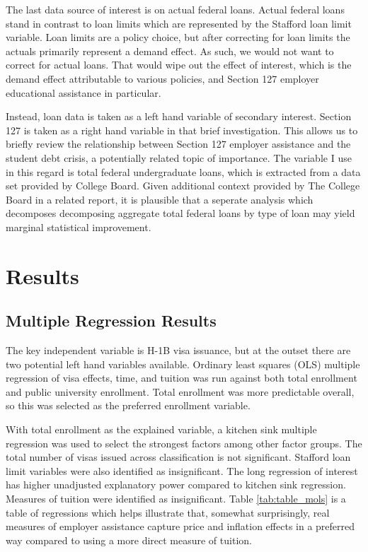\documentclass[review]{elsarticle}
\begin{document}
    The last data source of interest is on actual federal loans.
    Actual federal loans stand in contrast to loan limits which are represented by the Stafford loan limit variable.
    Loan limits are a policy choice, but after correcting for loan limits the actuals primarily represent a demand effect.
    As such, we would not want to correct for actual loans.
    That would wipe out the effect of interest,
    which is the demand effect attributable to various policies,
    and Section 127 employer educational assistance in particular.

    Instead, loan data is taken as a left hand variable of secondary interest.
    Section 127 is taken as a right hand variable in that brief investigation.
    This allows us to briefly review the relationship between Section 127 employer assistance
    and the student debt crisis, a potentially related topic of importance.
    The variable I use in this regard is total federal undergraduate loans,
    which is extracted from a data set provided by College Board\cite{cb_excel_2019}.
    Given additional context provided by The College Board in a related report\cite{cb_trends_2019},
    it is plausible that a seperate analysis which decomposes decomposing aggregate total federal loans by type of loan may yield marginal statistical improvement.

    \section{Results}

    \subsection{Multiple Regression Results}
    The key independent variable is H-1B visa issuance, but at the outset there are two potential left hand variables available.
    Ordinary least squares (OLS) multiple regression of visa effects, time, and tuition was run against both total enrollment and public university enrollment.
    Total enrollment was more predictable overall, so this was selected as the preferred enrollment variable.

    With total enrollment as the explained variable,
    a kitchen sink multiple regression was used to select the strongest factors among other factor groups.
    The total number of visas issued across classification is not significant.
    Stafford loan limit variables were also identified as insignificant.
    The long regression of interest has higher unadjusted explanatory power compared to kitchen sink regression.
    Measures of tuition were identified as insignificant.
    Table \ref{tab:table_mols} is a table of regressions which helps illustrate that, somewhat surprisingly,
    real measures of employer assistance capture price and inflation effects in a preferred way
    compared to using a more direct measure of tuition.
\end{document}
